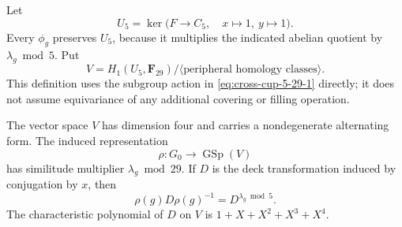 Let
\begin{equation}
 U_5=\ker\bigl(F\longrightarrow C_5,\quad x\mapsto1,\ y\mapsto1\bigr).
                                                               \label{eq:cross-cup-5-29-4}
\end{equation}
Every \(\phi_g\) preserves \(U_5\), because it multiplies
the indicated abelian quotient by
\(\lambda_g\bmod5\). Put
\begin{equation}
 V=H_1(U_5,\mathbf F_{29})/
             \langle\text{peripheral homology classes}\rangle .
                                                               \label{eq:cross-cup-5-29-5}
\end{equation}
This definition uses the subgroup action in \eqref{eq:cross-cup-5-29-1} directly;
it does not assume equivariance of any additional
covering or filling operation.

\begin{lemma}\label{lem:five-cover-similitude}
The vector space \(V\) has dimension four and carries a
nondegenerate alternating form.
The induced representation
\begin{equation}
                    \rho:G_0\longrightarrow
                                  \operatorname{GSp}(V)
                                                               \label{eq:cross-cup-5-29-6}
\end{equation}
has similitude multiplier \(\lambda_g\bmod29\).
If \(D\) is the deck transformation induced by conjugation
by \(x\), then
\begin{equation}
                  \rho(g)D\rho(g)^{-1}=D^{\lambda_g\bmod5}.
                                                               \label{eq:cross-cup-5-29-7}
\end{equation}
The characteristic polynomial of \(D\) on \(V\) is
\(1+X+X^2+X^3+X^4\).
\end{lemma}

